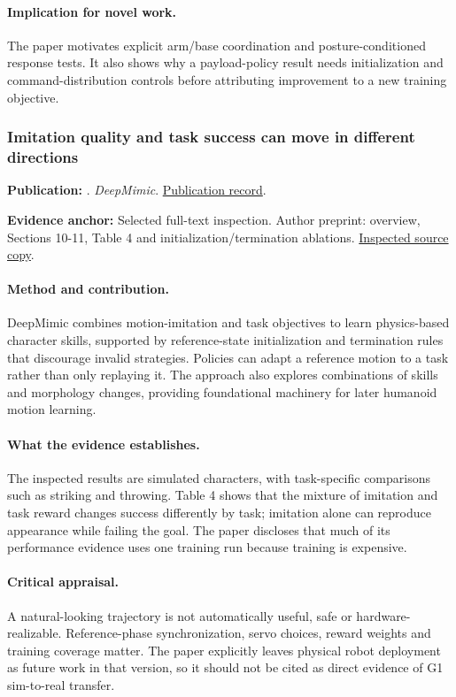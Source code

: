 \paragraph{Implication for novel work.} The paper motivates explicit arm/base coordination and posture-conditioned response tests. It also shows why a payload-policy result needs initialization and command-distribution controls before attributing improvement to a new training objective.

\subsubsection{Imitation quality and task success can move in different directions}\label{paper:deepmimic}
\textbf{Publication:} \citet{deepmimic}. \emph{DeepMimic}. \href{https://doi.org/10.1145/3197517.3201311}{Publication record}.

\textbf{Evidence anchor:} Selected full-text inspection. Author preprint: overview, Sections 10-11, Table 4 and initialization/termination ablations. \href{https://arxiv.org/pdf/1804.02717}{Inspected source copy}.

\paragraph{Method and contribution.} DeepMimic combines motion-imitation and task objectives to learn physics-based character skills, supported by reference-state initialization and termination rules that discourage invalid strategies. Policies can adapt a reference motion to a task rather than only replaying it. The approach also explores combinations of skills and morphology changes, providing foundational machinery for later humanoid motion learning.

\paragraph{What the evidence establishes.} The inspected results are simulated characters, with task-specific comparisons such as striking and throwing. Table 4 shows that the mixture of imitation and task reward changes success differently by task; imitation alone can reproduce appearance while failing the goal. The paper discloses that much of its performance evidence uses one training run because training is expensive.

\paragraph{Critical appraisal.} A natural-looking trajectory is not automatically useful, safe or hardware-realizable. Reference-phase synchronization, servo choices, reward weights and training coverage matter. The paper explicitly leaves physical robot deployment as future work in that version, so it should not be cited as direct evidence of G1 sim-to-real transfer.

